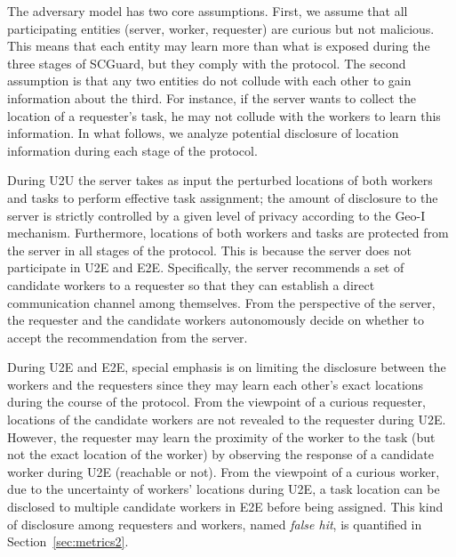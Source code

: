 \documentclass{USC-Thesis}
\numberwithin{equation}{chapter}
\begin{document}
The adversary model has two core assumptions. First, we assume that all participating entities (server, worker, requester) are curious but not malicious. This means that each entity may learn more than what is exposed during the three stages of SCGuard, but they comply with the protocol. The second assumption is that any two entities do not collude with each other to gain information about the third. For instance, if the server wants to collect the location of a requester's task, he may not collude with the workers to learn this information. In what follows, we analyze potential disclosure of location information during each stage of the protocol.

During U2U the server takes as input the perturbed locations of both workers and tasks to perform effective task assignment; 
the amount of disclosure to the server is strictly controlled by a given level of privacy according to the Geo-I mechanism. Furthermore, locations of both workers and tasks are protected from the server in all stages of the protocol. This is because the server does not participate in U2E and E2E. Specifically, the server recommends a set of candidate workers to a requester so that they can establish a direct communication channel among themselves. From the perspective of the server, the requester and the candidate workers autonomously decide on whether to accept the recommendation from the server.

During U2E and E2E, special emphasis is on limiting the disclosure between the workers and the requesters since they may learn each other's exact locations during the course of the protocol. From the viewpoint of a curious requester, locations of the candidate workers are not revealed to the requester during U2E. However, the requester may learn the proximity of the worker to the task (but not the exact location of the worker) by observing the response of a candidate worker during U2E (reachable or not). From the viewpoint of a curious worker, due to the uncertainty of workers' locations during U2E, a task location can be disclosed to multiple candidate workers in E2E before being assigned. This kind of disclosure among requesters and workers, named \emph{false hit}, is quantified in Section~\ref{sec:metrics2}.
\end{document}
